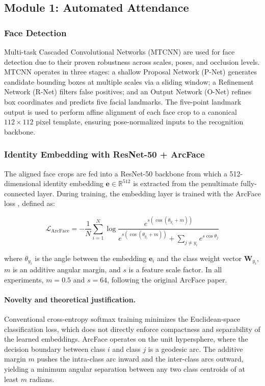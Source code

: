 \documentclass[preprint,12pt]{elsarticle}
\begin{document}
\subsection{Module 1: Automated Attendance}

\subsubsection{Face Detection}

Multi-task Cascaded Convolutional Networks (MTCNN) \cite{mtcnn} are used for face detection due to their proven robustness across scales, poses, and occlusion levels. MTCNN operates in three stages: a shallow Proposal Network (P-Net) generates candidate bounding boxes at multiple scales via a sliding window; a Refinement Network (R-Net) filters false positives; and an Output Network (O-Net) refines box coordinates and predicts five facial landmarks. The five-point landmark output is used to perform affine alignment of each face crop to a canonical $112 \times 112$ pixel template, ensuring pose-normalized inputs to the recognition backbone.

\subsubsection{Identity Embedding with ResNet-50 + ArcFace}

The aligned face crops are fed into a ResNet-50 backbone \cite{resnet} from which a 512-dimensional identity embedding $\mathbf{e} \in \mathbb{R}^{512}$ is extracted from the penultimate fully-connected layer. During training, the embedding layer is trained with the ArcFace loss \cite{arcface}, defined as:

\begin{equation}
\mathcal{L}_{\text{ArcFace}} = -\frac{1}{N}\sum_{i=1}^{N}
\log \frac{e^{s\left(\cos(\theta_{y_i}+m)\right)}}
          {e^{s\left(\cos(\theta_{y_i}+m)\right)} +
           \sum_{j \neq y_i} e^{s\cos\theta_j}}
\label{eq:arcface}
\end{equation}

where $\theta_{y_i}$ is the angle between the embedding $\mathbf{e}_i$ and the class weight vector $\mathbf{W}_{y_i}$, $m$ is an additive angular margin, and $s$ is a feature scale factor. In all experiments, $m = 0.5$ and $s = 64$, following the original ArcFace paper.

\paragraph{Novelty and theoretical justification.}
Conventional cross-entropy softmax training minimizes the Euclidean-space classification loss, which does not directly enforce compactness and separability of the learned embeddings. ArcFace operates on the unit hypersphere, where the decision boundary between class $i$ and class $j$ is a geodesic arc. The additive margin $m$ pushes the intra-class arc inward and the inter-class arcs outward, yielding a minimum angular separation between any two class centroids of at least $m$ radians.
\end{document}
